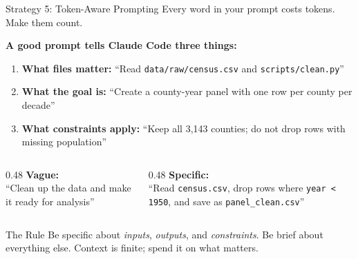 \documentclass[aspectratio=169, 11pt]{beamer}
\begin{document}
\begin{frame}{Strategy 5: Token-Aware Prompting}
  Every word in your prompt costs tokens. Make them count.

  \vspace{0.5em}
  \textbf{A good prompt tells Claude Code three things:}
  \begin{enumerate}
    \item \textbf{What files matter:} ``Read \texttt{data/raw/census.csv} and \texttt{scripts/clean.py}''
    \item \textbf{What the goal is:} ``Create a county-year panel with one row per county per decade''
    \item \textbf{What constraints apply:} ``Keep all 3,143 counties; do not drop rows with missing population''
  \end{enumerate}

  \vspace{0.5em}
  \begin{columns}[T]
    \begin{column}{0.48\textwidth}
      \textbf{\color{red!70!black} Vague:}\\
      {\small ``Clean up the data and make it ready for analysis''}
    \end{column}
    \begin{column}{0.48\textwidth}
      \textbf{\color{green!50!black} Specific:}\\
      {\small ``Read \texttt{census.csv}, drop rows where \texttt{year < 1950}, and save as \texttt{panel\_clean.csv}''}
    \end{column}
  \end{columns}

  \vspace{0.8em}
  \begin{block}{The Rule}
    Be specific about \textit{inputs}, \textit{outputs}, and \textit{constraints}. Be brief about everything else. Context is finite; spend it on what matters.
  \end{block}
\end{frame}

\end{document}
